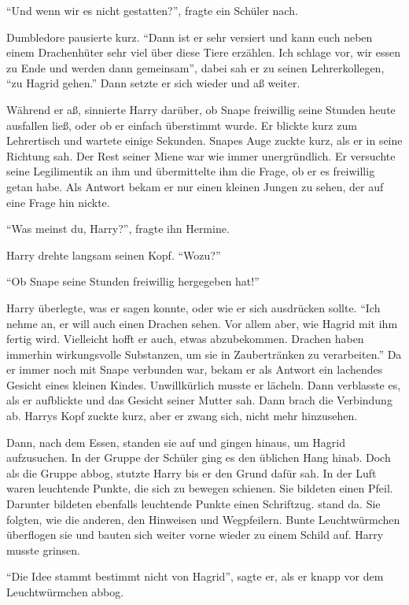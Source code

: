 \enquote{Und wenn wir es nicht gestatten?}, fragte ein Schüler nach.

Dumbledore pausierte kurz. \enquote{Dann ist er sehr versiert und kann euch neben einem Drachenhüter sehr viel über diese Tiere erzählen. Ich schlage vor, wir essen zu Ende und werden dann gemeinsam\abs}, dabei sah er zu seinen Lehrerkollegen, \enquote{\aabs zu Hagrid gehen.} Dann setzte er sich wieder und aß weiter.

Während er aß, sinnierte Harry darüber, ob Snape freiwillig seine Stunden heute ausfallen ließ, oder ob er einfach überstimmt wurde. Er blickte kurz zum Lehrertisch und wartete einige Sekunden. Snapes Auge zuckte kurz, als er in seine Richtung sah. Der Rest seiner Miene war wie immer unergründlich. Er versuchte seine Legilimentik an ihm und übermittelte ihm die Frage, ob er es freiwillig getan habe. Als Antwort bekam er nur einen kleinen Jungen zu sehen, der auf eine Frage hin nickte.

\enquote{Was meinst du, Harry?}, fragte ihn Hermine.

Harry drehte langsam seinen Kopf. \enquote{Wozu?}

\enquote{Ob Snape seine Stunden freiwillig hergegeben hat!}

Harry überlegte, was er sagen konnte, oder wie er sich ausdrücken sollte. \enquote{Ich nehme an, er will auch einen Drachen sehen. Vor allem aber, wie Hagrid mit ihm fertig wird. Vielleicht hofft er auch, etwas abzubekommen. Drachen haben immerhin wirkungsvolle Substanzen, um sie in Zaubertränken zu verarbeiten.} Da er immer noch mit Snape verbunden war, bekam er als Antwort ein lachendes Gesicht eines kleinen Kindes. Unwillkürlich musste er lächeln. Dann verblasste es, als er aufblickte und das Gesicht seiner Mutter sah. Dann brach die Verbindung ab. Harrys Kopf zuckte kurz, aber er zwang sich, nicht mehr hinzusehen.

Dann, nach dem Essen, standen sie auf und gingen hinaus, um Hagrid aufzusuchen. In der Gruppe der Schüler ging es den üblichen Hang hinab. Doch als die Gruppe abbog, stutzte Harry \gst bis er den Grund dafür sah. In der Luft waren leuchtende Punkte, die sich zu bewegen schienen. Sie bildeten einen Pfeil. Darunter bildeten ebenfalls leuchtende Punkte einen Schriftzug.  stand da. Sie folgten, wie die anderen, den Hinweisen und Wegpfeilern. Bunte Leuchtwürmchen überflogen sie und bauten sich weiter vorne wieder zu einem Schild auf. Harry musste grinsen.

\enquote{Die Idee stammt bestimmt nicht von Hagrid}, sagte er, als er knapp vor dem Leuchtwürmchen abbog.

